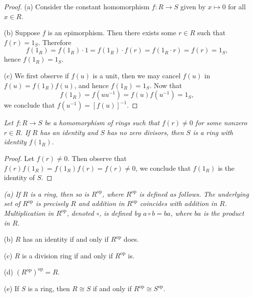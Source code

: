 \begin{proof}
(a) Consider the constant homomorphism $f:R\to S$ given by $x\mapsto 0$ for all $x\in R$.\par
(b) Suppose $f$ is an epimorphism. Then there exists some $r\in R$ such that $f(r)=1_S$. Therefore 
$$f(1_R)=f(1_R)\cdot 1=f(1_R)\cdot f(r)=f(1_R\cdot r)=f(r)=1_S,$$
hence $f(1_R)=1_S$.\par
(c) We first observe if $f(u)$ is a unit, then we may cancel $f(u)$ in $f(u)=f(1_R)f(u)$, and hence $f(1_R)=1_S$. Now that 
$$f(1_R)=f(uu^{-1})=f(u)f(u^{-1})=1_S,$$
we conclude that $f(u^{-1})=[f(u)]^{-1}$.
\end{proof}
\begin{problem}\em
Let $f:R\to S$ be a homomorphism of rings such that $f(r)\ne 0$ for some nonzero $r\in R$. If $R$ has an identity and $S$ has no zero divisors, then $S$ is a ring with identity $f(1_R)$.
\end{problem}
\begin{proof}
Let $f(r)\ne 0$. Then observe that $f(r)f(1_R)=f(1_R)f(r)=f(r)\ne 0$, we conclude that $f(1_R)$ is the identity of $S$.
\end{proof}
\begin{problem}\em
(a) If $R$ is a ring, then so is $R^{\mathrm{op}}$, where $R^{\mathrm{op}}$ is defined as follows. The underlying set of $R^{\mathrm{op}}$ is precisely $R$ and addition in $R^{\mathrm{op}}$ coincides with addition in $R$. Multiplication in $R^{\mathrm{op}}$, denoted $\circ$, is defined by $a\circ b=ba$, where $ba$ is the product in $R$.\par
(b) $R$ has an identity if and only if $R^{\mathrm{op}}$ does.\par
(c) $R$ is a division ring if and only if $R^{\mathrm{op}}$ is.\par
(d) $(R^{\mathrm{op}})^{\mathrm{op}}=R$.\par
(e) If $S$ is a ring, then $R\cong S$ if and only if $R^{\mathrm{op}}\cong S^{\mathrm{op}}$.
\end{problem}
